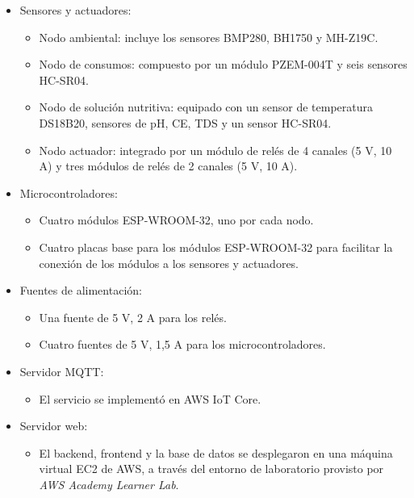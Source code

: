 \begin{itemize}
    \item Sensores y actuadores:
          \begin{itemize}
              \item Nodo ambiental: incluye los sensores BMP280, BH1750 y MH-Z19C.
              \item Nodo de consumos: compuesto por un módulo PZEM-004T y seis sensores HC-SR04.
              \item Nodo de solución nutritiva: equipado con un sensor de temperatura DS18B20,
                    sensores de pH, CE, TDS y un sensor HC-SR04.
              \item Nodo actuador: integrado por un módulo de relés de 4 canales (5 V, 10 A) y tres
                    módulos de relés de 2 canales (5 V, 10 A).
          \end{itemize}

    \item Microcontroladores:
          \begin{itemize}
              \item Cuatro módulos ESP-WROOM-32, uno por cada nodo.
              \item Cuatro placas base \cite{PlacaBaseESP32} para los módulos ESP-WROOM-32 para
                    facilitar la conexión de los módulos a los sensores y actuadores.
          \end{itemize}

    \item Fuentes de alimentación:
          \begin{itemize}
              \item Una fuente de 5 V, 2 A para los relés.
              \item Cuatro fuentes de 5 V, 1,5 A para los microcontroladores.
          \end{itemize}

    \item Servidor MQTT:
          \begin{itemize}
              \item El servicio se implementó en AWS IoT Core.
          \end{itemize}
          \newpage
    \item Servidor web:
          \begin{itemize}
              \item El backend, frontend y la base de datos se desplegaron en una máquina virtual
                    EC2 de AWS, a través del entorno de laboratorio provisto por \textit{AWS
                        Academy Learner Lab}.
          \end{itemize}
\end{itemize}

